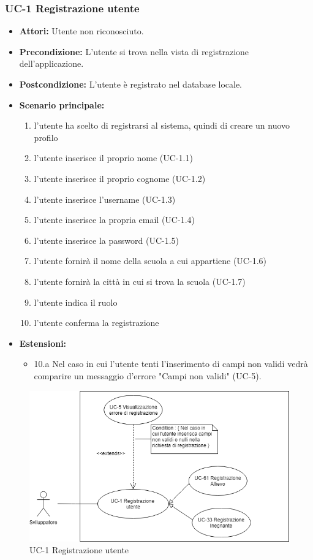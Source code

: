 \subsubsection{UC-1 Registrazione utente}
\begin{itemize}
		\item \textbf{Attori: }Utente non riconosciuto.
		\item \textbf{Precondizione: }L'utente si trova nella vista di registrazione dell'applicazione.
		\item \textbf{Postcondizione: }L'utente è registrato nel database locale.
		\item \textbf{Scenario principale: }
		\begin{enumerate}
		\item l'utente ha scelto di registrarsi al sistema, quindi di creare un nuovo profilo
		\item l'utente inserisce il proprio nome (UC-1.1)
		\item l'utente inserisce il proprio cognome (UC-1.2)
		\item l'utente inserisce l'username (UC-1.3)
		\item l'utente inserisce la propria email (UC-1.4)
		\item l'utente inserisce la password (UC-1.5)
		\item l'utente fornirà il nome della scuola a cui appartiene (UC-1.6)
		\item l'utente fornirà la città in cui si trova la scuola (UC-1.7)
		\item l'utente indica il ruolo
		\item l'utente conferma la registrazione
		\end{enumerate}
		\item \textbf{Estensioni: }
		\begin{itemize}
			\item 10.a Nel caso in cui l'utente tenti l'inserimento di campi non validi vedrà comparire un messaggio d'errore "Campi non validi" (UC-5).
		\end{itemize}
\end{itemize}

\begin{figure}[h]
	\centering
	\includegraphics[scale=0.7]{images/UC-1.png}
	\caption{UC-1 Registrazione utente}
\end{figure}

